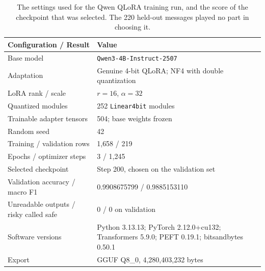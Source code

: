 \begin{table}[H]
\centering
\small
\renewcommand{\arraystretch}{1.12}
\begin{tabular}{L{5.0cm}L{8.0cm}}
\toprule
\textbf{Configuration / Result} & \textbf{Value} \\
\midrule
Base model & \texttt{Qwen3-4B-Instruct-2507} \\
Adaptation & Genuine 4-bit QLoRA; NF4 with double quantization \\
LoRA rank / scale & $r=16$, $\alpha=32$ \\
Quantized modules & 252 \texttt{Linear4bit} modules \\
Trainable adapter tensors & 504; base weights frozen \\
Random seed & 42 \\
Training / validation rows & 1{,}658 / 219 \\
Epochs / optimizer steps & 3 / 1{,}245 \\
Selected checkpoint & Step 200, chosen on the validation set \\
Validation accuracy / macro F1 & 0.9908675799 / 0.9885153110 \\
Unreadable outputs / risky called safe & 0 / 0 on validation \\
Software versions & Python 3.13.13; PyTorch 2.12.0+cu132; Transformers 5.9.0; PEFT 0.19.1; bitsandbytes 0.50.1 \\
Export & GGUF Q8\_0, 4{,}280{,}403{,}232 bytes \\
\bottomrule
\end{tabular}
\caption{The settings used for the Qwen QLoRA training run, and the score of the checkpoint that was selected. The 220 held-out messages played no part in choosing it.}
\label{tab:qlora-config}
\end{table}
